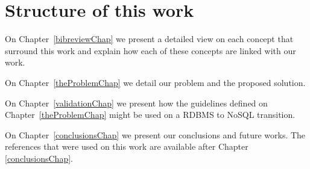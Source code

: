 \section{Structure of this work}

On Chapter~\ref{bibreviewChap} we present a detailed view on each concept that surround this work and explain how each of these concepts are linked with our work. 

On Chapter~\ref{theProblemChap} we detail our problem and the proposed solution.

On Chapter~\ref{validationChap} we present how the guidelines defined on Chapter~\ref{theProblemChap} might be used on a RDBMS to NoSQL transition. 

On Chapter~\ref{conclusionsChap} we present our conclusions and future works. The references that were used on this work are available after Chapter \ref{conclusionsChap}.  